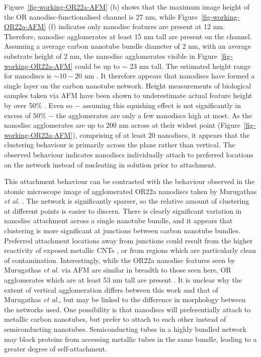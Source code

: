 \documentclass[
  a4paper,
]{scrbook}
\begin{document}
Figure~\ref{fig-working-OR22a-AFM} (b) shows that the maximum image
height of the OR nanodisc-functionalised channel is 27 nm, while
Figure~\ref{fig-working-OR22a-AFM} (f) indicates only nanodisc features
are present at 12 nm. Therefore, nanodisc agglomerates at least 15 nm
tall are present on the channel. Assuming a average carbon nanotube
bundle diameter of 2 nm, with an average substrate height of 2 nm, the
nanodisc agglomerates visible in Figure~\ref{fig-working-OR22a-AFM}
could be up to \(\sim\) 23 nm tall. The estimated height range for
nanodiscs is \(\sim 10 - 20\) nm
\autocite{Nath2007,Bayburt2010,Murugathas2020,Cheema2021}. It therefore
appears that nanodiscs have formed a single layer on the carbon nanotube
network. Height measurements of biological samples taken via AFM have
been shown to underestimate actual feature height by over 50\%
\autocite{Vobornik2023}. Even so \(-\) assuming this squishing effect is
not significantly in excess of 50\% \(-\) the agglomerates are only a
few nanodiscs high at most. As the nanodisc agglomerates are up to 200
nm across at their widest point (Figure~\ref{fig-working-OR22a-AFM}),
comprising of at least 20 nanodiscs, it appears that the clustering
behaviour is primarily across the plane rather than vertical. The
observed behaviour indicates nanodiscs individually attach to preferred
locations on the network instead of nucleating in solution prior to
attachment.

This attachment behaviour can be contrasted with the behaviour observed
in the atomic microscope image of agglomerated OR22a nanodiscs taken by
Murugathas \emph{et al.} \autocite{Murugathas2019a}. The network is
significantly sparser, so the relative amount of clustering at different
points is easier to discern. There is clearly significant variation in
nanodisc attachment across a single nanotube bundle, and it appears that
clustering is more significant at junctions between carbon nanotube
bundles. Preferred attachment locations away from junctions could result
from the higher reactivity of exposed metallic CNTs \autocite{Cao2009},
or from regions which are particularly clean of contamination.
Interestingly, while the OR22a nanodisc features seen by Murugathas
\emph{et al.} via AFM are similar in breadth to those seen here, OR
agglomerates which are at least 53 nm tall are present
\autocite{Murugathas2020}. It is unclear why the extent of vertical
agglomeration differs between this work and that of Murugathas \emph{et
al.}, but may be linked to the difference in morphology between the
networks used. One possibility is that nanodiscs will preferentially
attach to metallic carbon nanotubes, but prefer to attach to each other
instead of semiconducting nanotubes. Semiconducting tubes in a highly
bundled network may block proteins from accessing metallic tubes in the
same bundle, leading to a greater degree of self-attachment.
\end{document}
